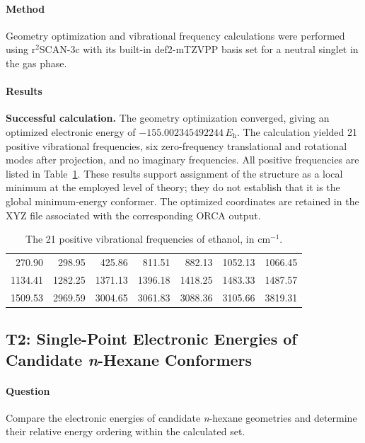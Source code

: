 \documentclass[a4paper,11pt]{article}
\newcommand{\Eh}{E_{\mathrm h}}
\begin{document}
\paragraph{Method}
Geometry optimization and vibrational frequency calculations were performed using r$^{2}$SCAN-3c with its built-in def2-mTZVPP basis set for a neutral singlet in the gas phase.

\paragraph{Results}
\textbf{Successful calculation.} The geometry optimization converged, giving an optimized electronic energy of $-155.002345492244\,\Eh$.
The calculation yielded 21 positive vibrational frequencies, six zero-frequency translational and rotational modes after projection, and no imaginary frequencies.
All positive frequencies are listed in Table~\ref{tab:t1-frequencies}.
These results support assignment of the structure as a local minimum at the employed level of theory; they do not establish that it is the global minimum-energy conformer.
The optimized coordinates are retained in the XYZ file associated with the corresponding ORCA output.

\begin{table}[H]
  \centering\small
  \caption{The 21 positive vibrational frequencies of ethanol, in cm$^{-1}$.}
  \label{tab:t1-frequencies}
  \begin{tabular}{rrrrrrr}
    \toprule
    270.90 & 298.95 & 425.86 & 811.51 & 882.13 & 1052.13 & 1066.45\\
    1134.41 & 1282.25 & 1371.13 & 1396.18 & 1418.25 & 1483.33 & 1487.57\\
    1509.53 & 2969.59 & 3004.65 & 3061.83 & 3088.36 & 3105.66 & 3819.31\\
    \bottomrule
  \end{tabular}
\end{table}

\subsection{T2: Single-Point Electronic Energies of Candidate \textit{n}-Hexane Conformers}
\paragraph{Question}
Compare the electronic energies of candidate \textit{n}-hexane geometries and determine their relative energy ordering within the calculated set.
\end{document}
